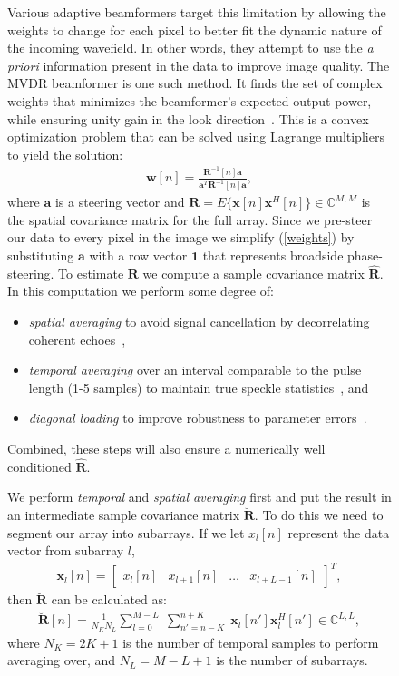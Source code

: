 \documentclass[12pt,journal,draftclsnofoot,onecolumn]{IEEEtran}
\newcommand\bmat[1]{\begin{bmatrix}#1\end{bmatrix}}
\newcommand\sumb[2]{\sum\limits_{#1}^{#2}\;}
\newcommand\T{^{\scriptscriptstyle T}}
\renewcommand\H{^{\scriptscriptstyle H}}
\renewcommand\vec[1]{\boldsymbol{#1}}
\newcommand\mat[1]{\boldsymbol{#1}}
\newcommand\1{\vec 1}
\renewcommand*\a{\vec a}
\newcommand*\x{\vec x}
\newcommand*\R{\mat R}
\newcommand*\Ri{\R^{-1}}
\newcommand*\eR{\mat{\hat R}}
\begin{document}
\begin{figure}[H]
Various adaptive beamformers target this limitation by allowing the weights to change for each pixel to better fit the dynamic nature of the incoming wavefield. In other words, they attempt to use the \emph{a priori} information present in the data to improve image quality. The MVDR beamformer is one such method. It finds the set of complex weights that minimizes the beamformer's expected output power, while ensuring unity gain in the look direction~\cite{Capon1969}. This is a convex optimization problem that can be solved using Lagrange multipliers to yield the solution:
\begin{gather}
\vec w[n] = \frac{\Ri[n]\a}{\a\T\Ri[n]\a},\label{weights}
\end{gather}
where $\a$ is a steering vector and $\R=E\{\x[n]\x\H[n]\} \in\mathbb{C}^{M,M}$ is the spatial covariance matrix for the full array. Since we pre-steer our data to every pixel in the image we simplify (\ref{weights}) by substituting $\a$ with a row vector $\1$ that represents broadside phase-steering. To estimate $\R$ we compute a sample covariance matrix $\eR$. In this computation we perform some degree of:
\begin{itemize}
\item \emph{spatial averaging} to avoid signal cancellation by decorrelating coherent echoes~\cite{Kailath1985},
\item \emph{temporal averaging} over an interval comparable to the pulse length (1-5 samples) to maintain true speckle statistics~\cite{Synnevag2009}, and
\item \emph{diagonal loading} to improve robustness to parameter errors~\cite{Cox1987,Maksym1979}.
\end{itemize}%
%
%
Combined, these steps will also ensure a numerically well conditioned $\eR$.

We perform \emph{temporal} and \emph{spatial averaging} first and put the result in an intermediate sample covariance matrix $\breve{\R}$. To do this we need to segment our array into subarrays. If we let $x_l[n]$ represent the data vector from subarray $l$,
\begin{gather}
\x_l[n] = \bmat{x_l[n] & x_{l+1}[n] & \dots & x_{l+L-1}[n]}\T,
\end{gather}
then $\breve{\R}$ can be calculated as:
\begin{gather}
\breve{\R}[n] =  \frac{1}{N_K N_L} \sumb{l=0}{M-L}\sumb{n'=n-K}{n+K} \x_l[n']\x_l\H[n'] \in\mathbb{C}^{L,L},\label{spatialR}
\end{gather}
where $N_K = 2K+1$ is the number of temporal samples to perform averaging over, and $N_L = M-L+1$ is the number of subarrays.


\end{figure}
\end{document}
